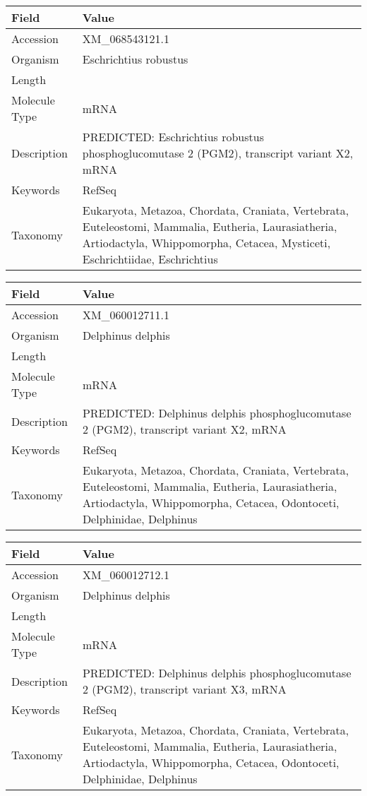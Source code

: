 \documentclass[10pt]{article}
\begin{document}
\vspace{1em}
{\footnotesize
\begin{longtable}{>{\raggedright\arraybackslash}p{4.5cm} >{\raggedright\arraybackslash}p{11.5cm}}
\textbf{Field} & \textbf{Value} \\
\hline
Accession & XM\_068543121.1 \\
Organism & Eschrichtius robustus \\
Length & 4131 \\
Molecule Type & mRNA \\
Description & PREDICTED: Eschrichtius robustus phosphoglucomutase 2 (PGM2), transcript variant X2, mRNA \\
Keywords & RefSeq \\
Taxonomy & Eukaryota, Metazoa, Chordata, Craniata, Vertebrata, Euteleostomi, Mammalia, Eutheria, Laurasiatheria, Artiodactyla, Whippomorpha, Cetacea, Mysticeti, Eschrichtiidae, Eschrichtius \\
\end{longtable}
}

\vspace{1em}
{\footnotesize
\begin{longtable}{>{\raggedright\arraybackslash}p{4.5cm} >{\raggedright\arraybackslash}p{11.5cm}}
\textbf{Field} & \textbf{Value} \\
\hline
Accession & XM\_060012711.1 \\
Organism & Delphinus delphis \\
Length & 6836 \\
Molecule Type & mRNA \\
Description & PREDICTED: Delphinus delphis phosphoglucomutase 2 (PGM2), transcript variant X2, mRNA \\
Keywords & RefSeq \\
Taxonomy & Eukaryota, Metazoa, Chordata, Craniata, Vertebrata, Euteleostomi, Mammalia, Eutheria, Laurasiatheria, Artiodactyla, Whippomorpha, Cetacea, Odontoceti, Delphinidae, Delphinus \\
\end{longtable}
}

\vspace{1em}
{\footnotesize
\begin{longtable}{>{\raggedright\arraybackslash}p{4.5cm} >{\raggedright\arraybackslash}p{11.5cm}}
\textbf{Field} & \textbf{Value} \\
\hline
Accession & XM\_060012712.1 \\
Organism & Delphinus delphis \\
Length & 6705 \\
Molecule Type & mRNA \\
Description & PREDICTED: Delphinus delphis phosphoglucomutase 2 (PGM2), transcript variant X3, mRNA \\
Keywords & RefSeq \\
Taxonomy & Eukaryota, Metazoa, Chordata, Craniata, Vertebrata, Euteleostomi, Mammalia, Eutheria, Laurasiatheria, Artiodactyla, Whippomorpha, Cetacea, Odontoceti, Delphinidae, Delphinus \\
\end{longtable}
}
\end{document}

